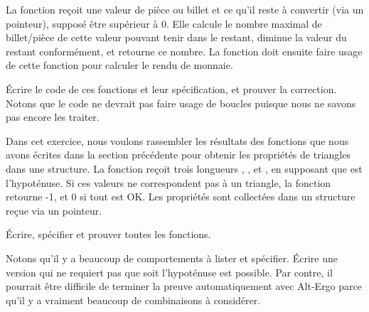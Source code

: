 

La fonction  reçoit une valeur de pièce ou
billet et ce qu'il reste à convertir (via un pointeur), supposé être
supérieur à 0. Elle calcule le nombre maximal de billet/pièce de cette
valeur pouvant tenir dans le restant, diminue la valeur du restant
conformément, et retourne ce nombre. La fonction 
doit ensuite faire usage de cette fonction pour calculer le rendu de
monnaie.


Écrire le code de ces fonctions et leur spécification, et prouver la
correction. Notons que le code ne devrait pas faire usage de boucles
puisque nous ne savons pas encore les traiter.




Dans cet exercice, nous voulons rassembler les résultats des fonctions
que nous avons écrites dans la section précédente pour obtenir les
propriétés de triangles dans une structure. La fonction
 reçoit trois longueurs ,
, et , en supposant que  est
l'hypoténuse. Si ces valeurs ne correspondent pas à un triangle, la
fonction retourne -1, et 0 si tout est OK. Les propriétés sont
collectées dans un structure  reçue via un pointeur.




Écrire, spécifier et prouver toutes les fonctions.

Notons qu'il y a beaucoup de comportements à lister et spécifier.
Écrire une version qui ne requiert pas que  soit
l'hypoténuse est possible. Par contre, il pourrait être difficile
de terminer la preuve automatiquement avec Alt-Ergo parce qu'il y a
vraiment beaucoup de combinaisons à considérer.

